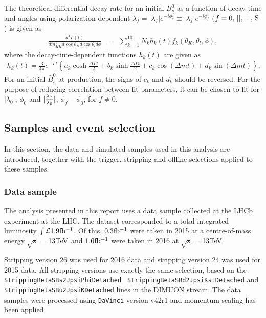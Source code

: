 The theoretical differential decay rate for an initial $B_s^0$ as a function of decay time and angles using polarization dependent $\lambda_f = |\lambda_f|e^{-i \phi_s^f} \equiv |\lambda_f|e^{-i \phi_f} $ ($f=0,\,{||},\,{\perp},\,{\rm S}$) is given as~\cite{Liu:2013nea}
\begin{eqnarray}
 \frac{d^4 \Gamma( t) }{dm_{KK }^2 d\cos\theta_K d\cos\theta_l d\phi}&=&  \sum_{k=1}^{10} N_k h_k(t) f_k(\theta_K, \theta_l, \phi),  \label{eq:rate_mult_lambda}
 \end{eqnarray}
where the decay-time-dependent functions $h_k(t)$ are given as
\begin{eqnarray}
 h_k(t)= \frac{3}{ 4\pi}
   e^{-\Gamma t}\left\{ a_k \cosh\frac{\Delta \Gamma t}{2} + b_k \sinh\frac{\Delta \Gamma t}{2} + c_k \cos(\Delta mt)  +  d_k \sin(\Delta mt) \right\}.
\label{eq:rate_mult_lambda2}
\end{eqnarray}
For an initial $\bar{B}_s^0$ at production, the signs of $c_k$ and $d_k$ should be reversed. 
For the purpose of reducing correlation between fit parameters, it can be chosen to fit for $|\lambda_0|$, $\phi_0$ and $|{{\lambda_f}\over {\lambda_0}}|$, $\phi_f-\phi_0$, for $f \neq 0$.

\subsection{Samples and event selection}

In this section, the data and simulated samples used in this analysis are introduced, together with the trigger, stripping and offline selections applied to these samples.

\subsubsection{Data sample}

The analysis presented in this report uses a data sample collected at the LHCb
experiment at the LHC\@. The dataset corresponded to a total integrated
luminosity $\int{\mathcal{L}}{1.9 \rm fb^{-1}}$. Of this, $0.3 \rm fb^{-1}$ were taken in 2015 at a centre-of-mass energy $\sqrt{s}$ = 13$\rm TeV$ and $1.6 \rm fb^{-1}$ were taken in 2016 at $\sqrt{s}$ = 13$\rm TeV$.

Stripping version 26 was used for 2016 data and stripping version 24 was
used for 2015 data.  All stripping versions use exactly the same selection,
based on the {\tt StrippingBetaSBs2JpsiPhiDetached} {\tt
StrippingBetaSBd2JpsiKstDetached} and {\tt StrippingBetaSBu2JpsiKDetached} lines
in the DIMUON stream.  The data samples were processed using {\tt DaVinci} version
v42r1 and momentum scaling has been applied.

